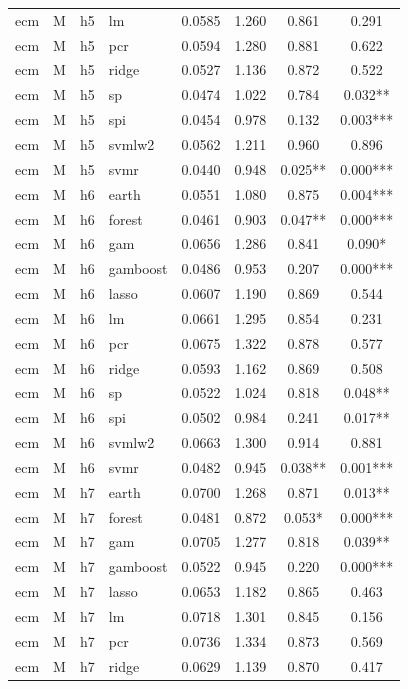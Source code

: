 \begin{ThreePartTable}
\begin{longtable}[t]{llclcccc}
ecm & M & h5 & lm & 0.0585 & 1.260 & 0.861 & 0.291\\
ecm & M & h5 & pcr & 0.0594 & 1.280 & 0.881 & 0.622\\
ecm & M & h5 & ridge & 0.0527 & 1.136 & 0.872 & 0.522\\
ecm & M & h5 & sp & 0.0474 & 1.022 & 0.784 & 0.032**\\
ecm & M & h5 & spi & 0.0454 & 0.978 & 0.132 & 0.003***\\
ecm & M & h5 & svmlw2 & 0.0562 & 1.211 & 0.960 & 0.896\\
ecm & M & h5 & svmr & 0.0440 & 0.948 & 0.025** & 0.000***\\
\addlinespace
ecm & M & h6 & earth & 0.0551 & 1.080 & 0.875 & 0.004***\\
ecm & M & h6 & forest & 0.0461 & 0.903 & 0.047** & 0.000***\\
ecm & M & h6 & gam & 0.0656 & 1.286 & 0.841 & 0.090*\\
ecm & M & h6 & gamboost & 0.0486 & 0.953 & 0.207 & 0.000***\\
ecm & M & h6 & lasso & 0.0607 & 1.190 & 0.869 & 0.544\\
ecm & M & h6 & lm & 0.0661 & 1.295 & 0.854 & 0.231\\
ecm & M & h6 & pcr & 0.0675 & 1.322 & 0.878 & 0.577\\
ecm & M & h6 & ridge & 0.0593 & 1.162 & 0.869 & 0.508\\
ecm & M & h6 & sp & 0.0522 & 1.024 & 0.818 & 0.048**\\
ecm & M & h6 & spi & 0.0502 & 0.984 & 0.241 & 0.017**\\
ecm & M & h6 & svmlw2 & 0.0663 & 1.300 & 0.914 & 0.881\\
ecm & M & h6 & svmr & 0.0482 & 0.945 & 0.038** & 0.001***\\
\addlinespace
ecm & M & h7 & earth & 0.0700 & 1.268 & 0.871 & 0.013**\\
ecm & M & h7 & forest & 0.0481 & 0.872 & 0.053* & 0.000***\\
ecm & M & h7 & gam & 0.0705 & 1.277 & 0.818 & 0.039**\\
ecm & M & h7 & gamboost & 0.0522 & 0.945 & 0.220 & 0.000***\\
ecm & M & h7 & lasso & 0.0653 & 1.182 & 0.865 & 0.463\\
ecm & M & h7 & lm & 0.0718 & 1.301 & 0.845 & 0.156\\
ecm & M & h7 & pcr & 0.0736 & 1.334 & 0.873 & 0.569\\
ecm & M & h7 & ridge & 0.0629 & 1.139 & 0.870 & 0.417\\

\end{longtable}
\end{ThreePartTable}
